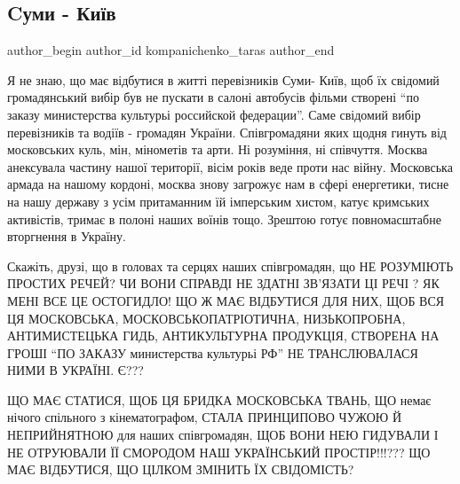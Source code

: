  
 
 
 
 
 
\subsection{Cуми - Київ}
\label{sec:28_11_2021.fb.kompanichenko_taras.1.sumy_kiev}
 
\ifcmt
 author_begin
   author_id kompanichenko_taras
 author_end
\fi

Я не знаю, що має відбутися в житті  перевізників Суми- Київ, щоб їх свідомий
громадянський  вибір був не пускати в салоні автобусів фільми створені \enquote{по
заказу министерства культурьі российской федерации}. Саме свідомий вибір
перевізників та водіїв - громадян України. Співгромадяни яких щодня гинуть від
московських куль, мін, мінометів та арти. Ні розуміння, ні співчуття. Москва
анексувала частину нашої території, вісім років веде проти нас війну.
Московська армада на нашому кордоні, москва знову  загрожує нам в сфері
енергетики, тисне на нашу державу з усім притаманним їй імперським хистом,
катує кримських активістів, тримає в полоні наших воїнів тощо. Зрештою готує
повномасштабне вторгнення в Україну. 

Скажіть, друзі, що в головах та серцях
наших співгромадян, що НЕ РОЗУМІЮТЬ ПРОСТИХ РЕЧЕЙ? ЧИ ВОНИ СПРАВДІ НЕ ЗДАТНІ
ЗВ'ЯЗАТИ ЦІ РЕЧІ ? ЯК МЕНІ ВСЕ ЦЕ ОСТОГИДЛО! ЩО Ж МАЄ ВІДБУТИСЯ ДЛЯ НИХ, ЩОБ
ВСЯ ЦЯ МОСКОВСЬКА, МОСКОВСЬКОПАТРІОТИЧНА, НИЗЬКОПРОБНА, АНТИМИСТЕЦЬКА ГИДЬ,
АНТИКУЛЬТУРНА ПРОДУКЦІЯ, СТВОРЕНА НА  ГРОШІ \enquote{ПО ЗАКАЗУ министерства культурьі
РФ} НЕ ТРАНСЛЮВАЛАСЯ НИМИ В УКРАЇНІ. Є??? 

ЩО МАЄ СТАТИСЯ, ЩОБ ЦЯ БРИДКА МОСКОВСЬКА ТВАНЬ, ЩО немає нічого спільного з
кінематографом, СТАЛА ПРИНЦИПОВО ЧУЖОЮ Й НЕПРИЙНЯТНОЮ для наших співгромадян,
ЩОБ ВОНИ НЕЮ ГИДУВАЛИ І НЕ ОТРУЮВАЛИ ЇЇ СМОРОДОМ НАШ УКРАЇНСЬКИЙ ПРОСТІР!!!???
ЩО МАЄ ВІДБУТИСЯ, ЩО ЦІЛКОМ ЗМІНИТЬ ЇХ СВІДОМІСТЬ?



